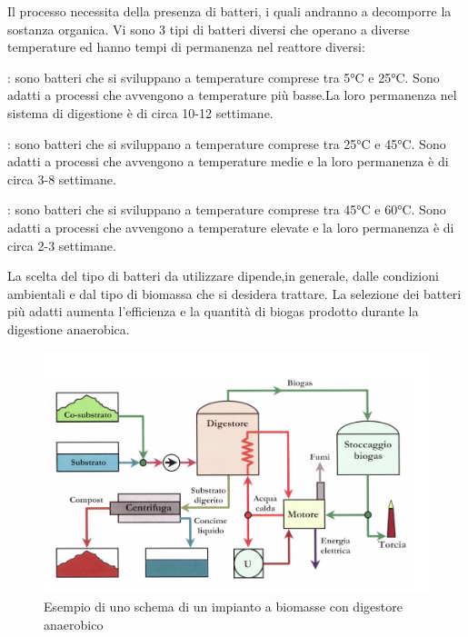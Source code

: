 Il processo necessita della presenza di batteri, i quali andranno a decomporre la sostanza organica. Vi sono 3 tipi di batteri diversi che operano a diverse temperature ed hanno tempi di permanenza nel reattore diversi:\\
\begin{description}[labelindent=5mm]
    \item[$\bullet$ Batteri psicrofili]: sono batteri che si sviluppano a temperature comprese tra 5°C e 25°C. Sono adatti a processi che avvengono a temperature più basse.La loro permanenza nel sistema di digestione è di circa 10-12 settimane.
    \item[$\bullet$ Batteri mesofili]: sono batteri che si sviluppano a temperature comprese tra 25°C e 45°C. Sono adatti a processi che avvengono a temperature medie e la loro permanenza è di circa 3-8 settimane.
    \item[$\bullet$ Batteri termofili]: sono batteri che si sviluppano a temperature comprese tra 45°C e 60°C. Sono adatti a processi che avvengono a temperature elevate e la loro permanenza è di circa 2-3 settimane.
\end{description}
\vfill
\newpage
La scelta del tipo di batteri da utilizzare dipende,in generale, dalle condizioni ambientali e dal tipo di biomassa che si desidera trattare. La selezione dei batteri più adatti aumenta l'efficienza e la quantità di biogas prodotto durante la digestione anaerobica.\\
\begin{figure}[H]
    \centering
    \includegraphics[height=0.5\textwidth]{res/cap 3/Biomasse}
    \caption{Esempio di uno schema di un impianto a biomasse con digestore anaerobico\cite{Materiale_didattico_prof_savino}}
\end{figure}\noindent
